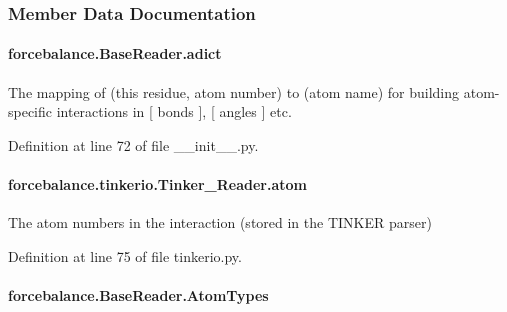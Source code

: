 \subsubsection{Member Data Documentation}
\hypertarget{classforcebalance_1_1BaseReader_a2c46ad6b66cf09a30e917ce4a1997e2a}{
\paragraph[{adict}]{\setlength{\rightskip}{0pt plus 5cm}forcebalance.\-Base\-Reader.\-adict\hspace{0.3cm}{\ttfamily [inherited]}}}\label{classforcebalance_1_1BaseReader_a2c46ad6b66cf09a30e917ce4a1997e2a}


The mapping of (this residue, atom number) to (atom name) for building atom-\/specific interactions in \mbox{[} bonds \mbox{]}, \mbox{[} angles \mbox{]} etc. 



Definition at line 72 of file \-\_\-\-\_\-init\-\_\-\-\_\-.\-py.

\hypertarget{classforcebalance_1_1tinkerio_1_1Tinker__Reader_a77b335b67d8e723248ac52515867607d}{
\paragraph[{atom}]{\setlength{\rightskip}{0pt plus 5cm}forcebalance.\-tinkerio.\-Tinker\-\_\-\-Reader.\-atom}}\label{classforcebalance_1_1tinkerio_1_1Tinker__Reader_a77b335b67d8e723248ac52515867607d}


The atom numbers in the interaction (stored in the T\-I\-N\-K\-E\-R parser) 



Definition at line 75 of file tinkerio.\-py.

\hypertarget{classforcebalance_1_1BaseReader_a69ca7d949a4a3df4d9f61e617fe0e270}{
\paragraph[{Atom\-Types}]{\setlength{\rightskip}{0pt plus 5cm}forcebalance.\-Base\-Reader.\-Atom\-Types\hspace{0.3cm}{\ttfamily [inherited]}}}\label{classforcebalance_1_1BaseReader_a69ca7d949a4a3df4d9f61e617fe0e270}



